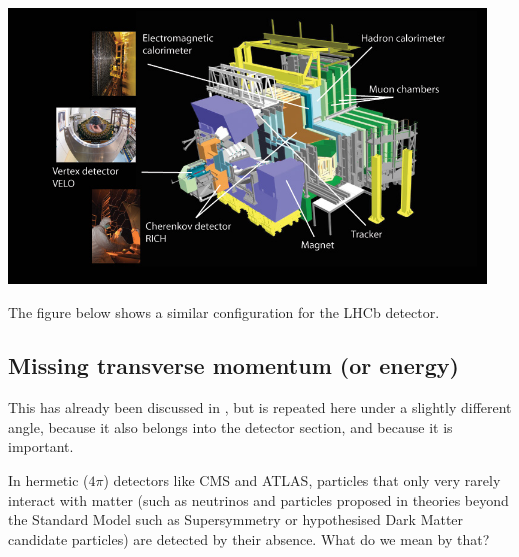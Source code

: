 \begin{center}
\includegraphics[width=0.95\textwidth]{fig/detector/lhcb_detector.png}
\end{center}
The figure below shows a similar configuration for the LHCb detector.

\subsection{Missing transverse momentum (or energy)}
This has already been discussed in , but is repeated here under a slightly different angle, because it also belongs into the detector section, and because it is important.

In hermetic ($4\pi$) detectors like CMS and ATLAS, particles that only very rarely interact
with matter (such as neutrinos and particles proposed in theories beyond the Standard Model such as Supersymmetry or hypothesised Dark Matter candidate particles) are detected by their absence. What do we mean by that? 

